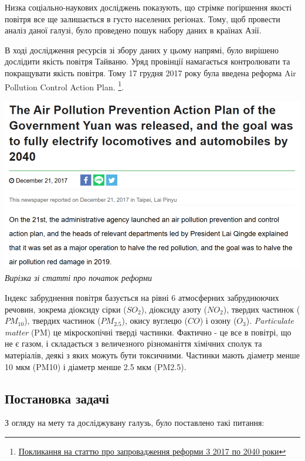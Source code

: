 \documentclass{article}
\begin{document}
Низка соціально-наукових досліджень показують, що стрімке погіршення якості повітря все ще залишається в густо населених регіонах. Тому, щоб провести аналіз даної галузі, було проведено пошук набору даних в країнах Азії. 

В ході дослідження ресурсів зі збору даних у цьому напрямі, було вирішено дослідити якість повітря Тайваню. Уряд провінції намагається контролювати та покращувати якість повітря. Тому 17 грудня 2017 року була введена  реформа Air Pollution Control Action Plan. \footnote{\href{https://e-info.org.tw/node/209138}{Покликання на статтю про запровадження реформи 3 2017 по 2040 роки}}.

\begin{center}
    \includegraphics[height=3in]{notes/media/air_quality_reform_news.png}\\
    \textit{Вирізка зі статті про початок реформи}
\end{center}

Індекс забруднення повітря базується на рівні 6 атмосферних забруднюючих речовин, зокрема діоксиду сірки ($SO_2$), діоксиду азоту ($NO_2$), твердих частинок ($PM_{10}$), твердих частинок ($PM_{2.5}$), окису вуглецю ($CO$) і озону ($O_3$). 
\textit{Particulate matter} (PM) це мікроскопічні тверді частинки. Фактично - це все в повітрі, що не є газом, і складається з величезного різноманіття хімічних сполук та матеріалів, деякі з яких можуть бути токсичними. 
Частинки мають діаметр менше 10 мкм (PM10) і діаметр менше 2.5 мкм (PM2.5).
\subsection{Постановка задачі}
З огляду на мету та досліджувану галузь, було поставлено такі питання: 
\end{document}
